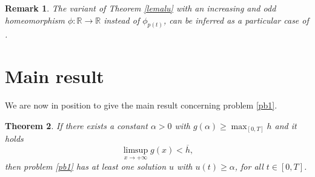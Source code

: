 \documentclass[11pt]{amsart}
\newtheorem{theorem}{Theorem}[section]
\newtheorem{remark}[theorem]{Remark}
\numberwithin{equation}{section} \textwidth=15.5cm
\begin{document}
\begin{remark}\label{rem2}\emph{The variant of Theorem \ref{lemalu} with an increasing and odd homeomorphism $\phi:\mathbb{R} \to \mathbb{R}$ instead of $\phi_{p(t)}$,  can be inferred as a particular case of \cite[Theorem 8.12]{[RaStTv]}.  }
\end{remark}




\section{Main result}\label{final}

We are now in position to give the main result concerning problem \eqref{pb1}.

\begin{theorem}\label{mainth}
If there exists a constant $\alpha>0$ with $g(\alpha) \geq \max_{[0,T]}h$ and it holds
\begin{equation}\label{conditieg}
\limsup_{x\to+\infty}g(x)<\overline{h},
\end{equation}
then problem \eqref{pb1} has at least one solution $u$ with $u(t)\geq\alpha$, for all $t\in[0,T]$.
\end{theorem}
\end{document}
